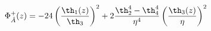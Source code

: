 \begin{equation} \label{dirac-index}
  \Phi^+_{\hat A}(z)=  -24 \left({\th_1(z)\over\th_3}
    \right)^2 + 2 {\th_2^4-\th_4^4 \over\eta^4} \left(
   {\th_3(z)\over\eta} \right)^2  
\end{equation}

